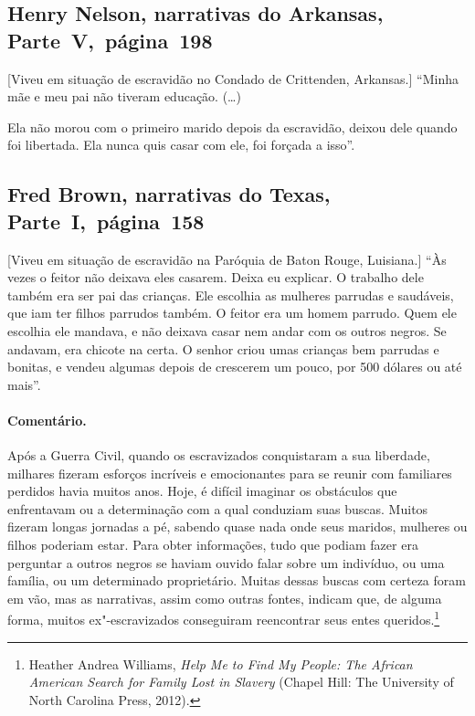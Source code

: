 \subsection{Henry Nelson, narrativas do Arkansas, Parte~V,~página~198}

{[}Viveu em situação de escravidão no Condado de Crittenden, Arkansas.{]} ``Minha mãe e meu pai não tiveram educação. (\ldots{})

Ela não morou com o primeiro marido depois da escravidão, deixou dele
quando foi libertada. Ela nunca quis casar com ele, foi forçada a isso''.

\subsection{Fred Brown, narrativas do Texas, Parte~I,~página~158} \label{ref36}

{[}Viveu em situação de escravidão na Paróquia de Baton Rouge, Luisiana.{]} ``Às vezes o feitor não deixava eles casarem. Deixa eu explicar. O
trabalho dele também era ser pai das crianças. Ele escolhia as mulheres
parrudas e saudáveis, que iam ter filhos parrudos também. O feitor era
um homem parrudo. Quem ele escolhia ele mandava, e não deixava casar nem
andar com os outros negros. Se andavam, era chicote na certa. O senhor
criou umas crianças bem parrudas e bonitas, e vendeu algumas depois de
crescerem um pouco, por 500 dólares ou até mais''.

\paragraph{Comentário.}\quad
{\small
Após a Guerra Civil, quando os escravizados conquistaram a sua
liberdade, milhares fizeram esforços incríveis e emocionantes para se
reunir com familiares perdidos havia muitos anos. Hoje, é difícil
imaginar os obstáculos que enfrentavam ou a determinação com a qual
conduziam suas buscas. Muitos fizeram longas jornadas a pé, sabendo
quase nada onde seus maridos, mulheres ou filhos poderiam estar. Para
obter informações, tudo que podiam fazer era perguntar a outros negros
se haviam ouvido falar sobre um indivíduo, ou uma família, ou um
determinado proprietário. Muitas dessas buscas com certeza foram em vão,
mas as narrativas, assim como outras fontes, indicam que, de alguma
forma, muitos ex"-escravizados conseguiram reencontrar seus entes
queridos.\footnote{Heather Andrea Williams, \emph{Help Me to Find My
  People: The African American Search for Family Lost in Slavery}
  (Chapel Hill: The University of North Carolina Press, 2012).}
}


